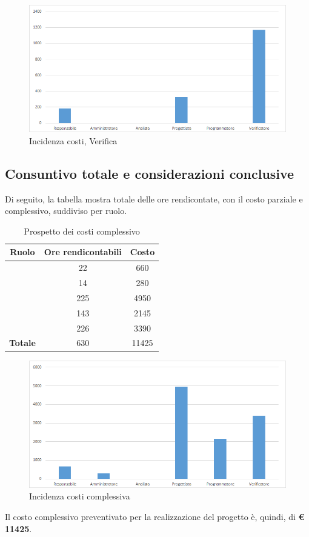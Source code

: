 \begin{figure}[H]
	\centering
	\includegraphics[scale=0.6]{img/8-5.png}
	\caption{Incidenza costi, Verifica}
\end{figure}

\subsection{Consuntivo totale e considerazioni conclusive}

Di seguito, la tabella mostra totale delle ore rendicontate, con il costo parziale e complessivo, suddiviso per ruolo. 

\begin{table}[H]
	\begin{center}
		\begin{tabular}{|c|c|c|}
			\hline
			\textbf{Ruolo}	& \textbf{Ore rendicontabili} & \textbf{Costo} \\
			\hline
			\Res	&	22  &	660	\\
			\hline
			\Amm	&	14  &	280	\\
			\hline
			\Prog	&	225  &	4950	\\
			\hline
			\Progr	&	143  &	2145	\\
			\hline
			\Ver	&	226  &	3390	\\
			\hline
			\textbf{Totale}  &	630  &	11425	\\
			\hline
		\end{tabular}
	\end{center}
	\caption{Prospetto dei costi complessivo}
\end{table}

\begin{figure}[H]
	\centering
	\includegraphics[scale=0.6]{img/8-6.png}
	\caption{Incidenza costi complessiva}
\end{figure}

Il costo complessivo preventivato per la realizzazione del progetto è, quindi, di \textbf{€ 11425}.